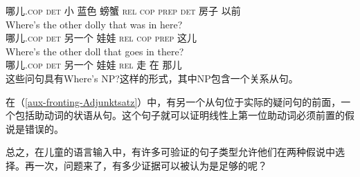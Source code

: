 哪儿.\textsc{cop} \textsc{det} 小 蓝色 螃蟹 \textsc{rel} \textsc{cop} \textsc{prep} \textsc{det} 房子 以前\\
\ex 
\gll Where's the other dolly that was in here?\\
哪儿.\textsc{cop} \textsc{det} 另一个 娃娃  \textsc{rel} \textsc{cop} \textsc{prep} 这儿\\
\ex 
\gll Where's the other doll that goes in there?\\
哪儿.\textsc{cop} \textsc{det} 另一个 娃娃 \textsc{rel} 走 在 那儿 \\
\zl
这些问句具有Where's NP?这样的形式，其中NP包含一个关系从句。

在（\ref{aux-fronting-Adjunktsatz}）中，有另一个从句位于实际的疑问句的前面，一个包括助动词的状语从句。这个句子就可以证明线性上第一位助动词必须前置的假说是错误的\citep[]{Sampson89a}。

总之，在儿童的语言输入中，有许多可验证的句子类型允许他们在两种假说中选择。再一次，问题来了，有多少证据可以被认为是足够的呢？

